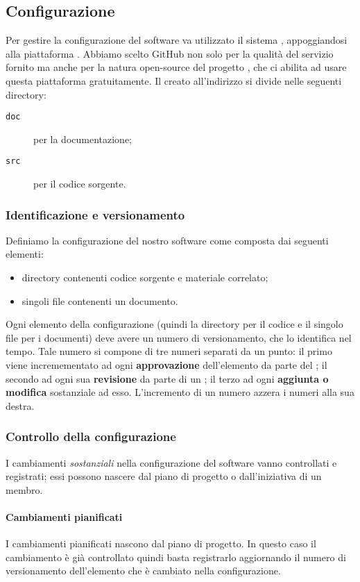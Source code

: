 \subsection{Configurazione} \label{sec:config}
Per gestire la configurazione del software va utilizzato il sistema , appoggiandosi alla piattaforma . Abbiamo scelto GitHub non solo per la qualità del servizio fornito ma anche per la natura open-source del progetto \proj, che ci abilita ad usare questa piattaforma gratuitamente. Il  creato all'indirizzo \repo{} si divide nelle seguenti directory:
\begin{description}
	\item[\texttt{doc}] per la documentazione;
	\item[\texttt{src}] per il codice sorgente.
\end{description}

\subsubsection{Identificazione e versionamento} \label{sec:idvers}
Definiamo la configurazione del nostro software come composta dai seguenti elementi:
\begin{itemize}
	\item directory contenenti codice sorgente e materiale correlato;
	\item singoli file contenenti un documento.
\end{itemize}
Ogni elemento della configurazione (quindi la directory per il codice e il singolo file per i documenti) deve avere un numero di versionamento, che lo identifica nel tempo. Tale numero si compone di tre numeri separati da un punto: il primo viene incremementato ad ogni \textbf{approvazione} dell'elemento da parte del ; il secondo ad ogni sua \textbf{revisione} da parte di un ; il terzo ad ogni \textbf{aggiunta o modifica} sostanziale ad esso. L'incremento di un numero azzera i numeri alla sua destra.

\subsubsection{Controllo della configurazione} I cambiamenti \emph{sostanziali} nella configurazione del software vanno controllati e registrati; essi possono nascere dal piano di progetto o dall'iniziativa di un membro.
\paragraph{Cambiamenti pianificati} I cambiamenti pianificati nascono dal piano di progetto. In questo caso il cambiamento è già controllato quindi basta registrarlo aggiornando il numero di versionamento dell'elemento che è cambiato nella configurazione.
